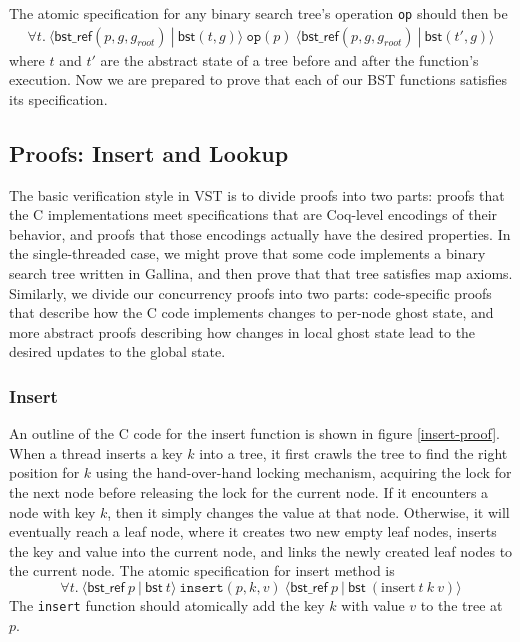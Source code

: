 \documentclass[acmsmall,screen]{acmart}\settopmatter{printfolios=true}
\newcommand{\treerep}{\ensuremath{\mathsf{bst}}}
\newcommand{\nodeboxrep}{\ensuremath{\mathsf{bst\_ref}}}
\begin{document}
The atomic specification for any binary search tree's operation \texttt{op} should then be
\begin{align*}\forall t.\ \langle \nodeboxrep(p,g,g_{\mathit{root}})\ |\ \treerep(t,g)\rangle\ \texttt{op}(p)\ \langle \nodeboxrep(p,g,g_{\mathit{root}})\ |\ \treerep(t', g)\rangle
\end{align*}
where $t$ and $t'$ are the abstract state of a tree before and after the function's execution. Now we are prepared to prove that each of our BST functions satisfies its specification.

\subsection{Proofs: Insert and Lookup}
The basic verification style in VST is to divide proofs into two parts: proofs that the C implementations meet specifications that are Coq-level encodings of their behavior, and proofs that those encodings actually have the desired properties. In the single-threaded case, we might prove that some code implements a binary search tree written in Gallina, and then prove that that tree satisfies map axioms. Similarly, we divide our concurrency proofs into two parts: code-specific proofs that describe how the C code implements changes to per-node ghost state, and more abstract proofs describing how changes in local ghost state lead to the desired updates to the global state.

\subsubsection{Insert}
An outline of the C code for the insert function is shown in figure \ref{insert-proof}. When a thread inserts a key $k$ into a tree, it first crawls the tree to find the right position for $k$ using the hand-over-hand locking mechanism, acquiring the lock for the next node before releasing the lock for the current node. If it encounters a node with key $k$, then it simply changes the value at that node. Otherwise, it will eventually reach a leaf node, where it creates two new empty leaf nodes, inserts the key and value into the current node, and links the newly created leaf nodes to the current node. The atomic specification for insert method is $$\forall t.\ \langle \nodeboxrep\ p\ |\ \treerep\ t\rangle\ \texttt{insert}(p, k, v)\ \langle \nodeboxrep\ p\ |\ \treerep\ (\mathrm{insert}\ t\ k\ v)\rangle$$
The \texttt{insert} function should atomically add the key $k$ with value $v$ to the tree at $p$.
\end{document}
